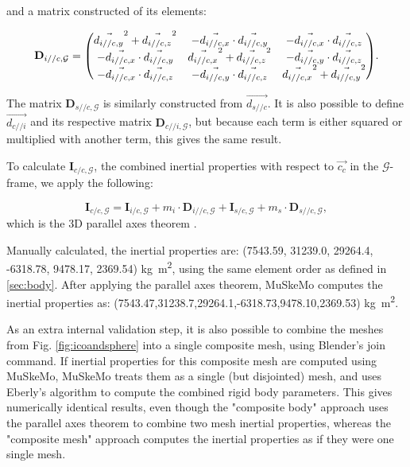 \documentclass{article}
\begin{document}
and a matrix constructed of its elements:

\begin{equation}
    \mathbf{D}_{i//c,\mathcal{G}} = \mqty(
        \vec{d_{i//c, y}}^2 + \vec{d_{i//c, z}}^2& - \vec{d_{i//c, x}} \cdot \vec{d_{i//c, y}} & - \vec{d_{i//c, x}} \cdot \vec{d_{i//c, z}} \\
        - \vec{d_{i//c, x}} \cdot \vec{d_{i//c, y}} &\vec{d_{i//c, x}}^2 + \vec{d_{i//c, z}}^2& - \vec{d_{i//c, y}} \cdot \vec{d_{i//c, z}}  \\
        - \vec{d_{i//c, x}} \cdot \vec{d_{i//c, z}}  & - \vec{d_{i//c, y}} \cdot \vec{d_{i//c, z}}  & \vec{d_{i//c, x}}^2 + \vec{d_{i//c, y}}^2
    ).
\end{equation}

The matrix \(\mathbf{D}_{s//c,\mathcal{G}}\) is similarly constructed from \(\vec{{d_{s//c}}}\). It is also possible to define \(\vec{d_{c//i}}\) and its respective matrix \(\mathbf{D}_{c//i,\mathcal{G}}\), but because each term is either squared or multiplied with another term, this gives the same result.

To calculate \(\mathbf{I}_{c/c,{\mathcal{G}}}\), the combined inertial properties with respect to \(\vec{c_c}\) in the \(\mathcal{G}\)-frame, we apply the following:

\begin{equation}
\mathbf{I}_{c/c,{\mathcal{G}}} = \mathbf{I}_{i/c,{\mathcal{G}}} + m_i \cdot \mathbf{D}_{i//c,\mathcal{G}} +  \mathbf{I}_{s/c,{\mathcal{G}}} + m_s \cdot \mathbf{D}_{s//c,\mathcal{G}},
\end{equation}
which is the 3D parallel axes theorem \cite{valleryAdvancedDynamics2019,ruinaMechanicsToolsetStatics2019}.

Manually calculated, the inertial properties are:
(7543.59, 31239.0, 29264.4, -6318.78, 9478.17, 2369.54) \si{kg m^2}, using the same element order as defined in \ref{sec:body}. After applying the parallel axes theorem, MuSkeMo computes the inertial properties as: (7543.47,31238.7,29264.1,-6318.73,9478.10,2369.53) \si{kg m^2}.

As an extra internal validation step, it is also possible to combine the meshes from Fig. \ref{fig:icoandsphere} into a single composite mesh, using Blender's join command. If inertial properties for this composite mesh are computed using MuSkeMo, MuSkeMo treats them as a single (but disjointed) mesh, and uses Eberly's algorithm to compute the combined rigid body parameters. This gives numerically identical results, even though the "composite body" approach uses the parallel axes theorem to combine two mesh inertial properties, whereas the "composite mesh" approach computes the inertial properties as if they were one single mesh.
\end{document}
